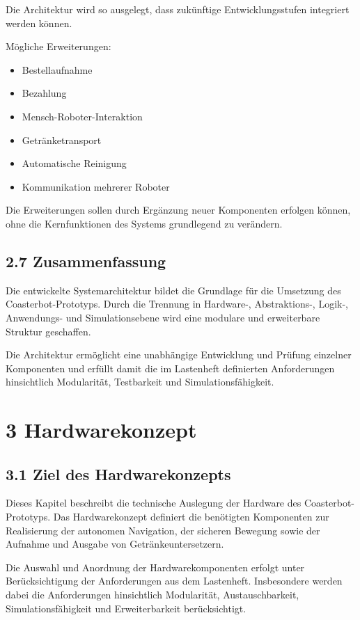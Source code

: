\documentclass[
]{article}
\providecommand{\tightlist}{%
  \setlength{\itemsep}{0pt}\setlength{\parskip}{0pt}}
\begin{document}
Die Architektur wird so ausgelegt, dass zukünftige Entwicklungsstufen
integriert werden können.

Mögliche Erweiterungen:

\begin{itemize}
\tightlist
\item
  Bestellaufnahme
\item
  Bezahlung
\item
  Mensch-Roboter-Interaktion
\item
  Getränketransport
\item
  Automatische Reinigung
\item
  Kommunikation mehrerer Roboter
\end{itemize}

Die Erweiterungen sollen durch Ergänzung neuer Komponenten erfolgen
können, ohne die Kernfunktionen des Systems grundlegend zu verändern.

\subsection{2.7 Zusammenfassung}\label{zusammenfassung}

Die entwickelte Systemarchitektur bildet die Grundlage für die Umsetzung
des Coasterbot-Prototyps. Durch die Trennung in Hardware-,
Abstraktions-, Logik-, Anwendungs- und Simulationsebene wird eine
modulare und erweiterbare Struktur geschaffen.

Die Architektur ermöglicht eine unabhängige Entwicklung und Prüfung
einzelner Komponenten und erfüllt damit die im Lastenheft definierten
Anforderungen hinsichtlich Modularität, Testbarkeit und
Simulationsfähigkeit.

\section{3 Hardwarekonzept}\label{hardwarekonzept}

\subsection{3.1 Ziel des
Hardwarekonzepts}\label{ziel-des-hardwarekonzepts}

Dieses Kapitel beschreibt die technische Auslegung der Hardware des
Coasterbot-Prototyps. Das Hardwarekonzept definiert die benötigten
Komponenten zur Realisierung der autonomen Navigation, der sicheren
Bewegung sowie der Aufnahme und Ausgabe von Getränkeuntersetzern.

Die Auswahl und Anordnung der Hardwarekomponenten erfolgt unter
Berücksichtigung der Anforderungen aus dem Lastenheft. Insbesondere
werden dabei die Anforderungen hinsichtlich Modularität,
Austauschbarkeit, Simulationsfähigkeit und Erweiterbarkeit
berücksichtigt.
\end{document}
